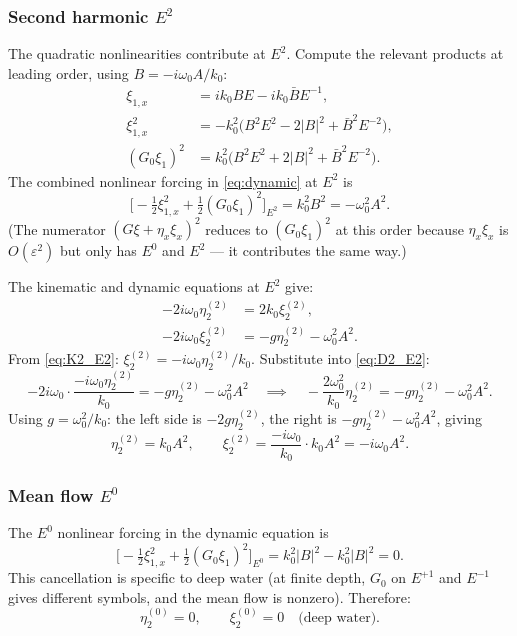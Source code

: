 \documentclass[11pt]{article}
\newcommand{\eps}{\varepsilon}
\begin{document}
\subsubsection{Second harmonic $E^2$}

The quadratic nonlinearities contribute at $E^2$.
Compute the relevant products at leading order, using $B = -i\omega_0 A/k_0$:
\begin{align}
\xi_{1,x} &= ik_0 BE - ik_0\bar B E^{-1}, \\
\xi_{1,x}^2 &= -k_0^2\bigl(B^2 E^2 - 2|B|^2 + \bar B^2 E^{-2}\bigr), \\
(G_0\xi_1)^2 &= k_0^2\bigl(B^2 E^2 + 2|B|^2 + \bar B^2 E^{-2}\bigr).
\end{align}
The combined nonlinear forcing in \eqref{eq:dynamic} at $E^2$ is
\[
\bigl[-\tfrac{1}{2}\xi_{1,x}^2 + \tfrac{1}{2}(G_0\xi_1)^2\bigr]_{E^2}
= k_0^2 B^2 = -\omega_0^2 A^2.
\]
(The numerator $(G\xi + \eta_x\xi_x)^2$ reduces to $(G_0\xi_1)^2$
at this order because $\eta_x\xi_x$ is $O(\eps^2)$ but only has
$E^0$ and $E^2$ --- it contributes the same way.)

The kinematic and dynamic equations at $E^2$ give:
\begin{align}
-2i\omega_0\eta_2^{(2)} &= 2k_0\xi_2^{(2)}, \label{eq:K2_E2}\\
-2i\omega_0\xi_2^{(2)} &= -g\eta_2^{(2)} - \omega_0^2 A^2. \label{eq:D2_E2}
\end{align}
From \eqref{eq:K2_E2}: $\xi_2^{(2)} = -i\omega_0\eta_2^{(2)}/k_0$.
Substitute into \eqref{eq:D2_E2}:
\[
-2i\omega_0\cdot\frac{-i\omega_0\eta_2^{(2)}}{k_0} = -g\eta_2^{(2)} - \omega_0^2 A^2
\quad\implies\quad
-\frac{2\omega_0^2}{k_0}\eta_2^{(2)} = -g\eta_2^{(2)} - \omega_0^2 A^2.
\]
Using $g = \omega_0^2/k_0$:
the left side is $-2g\eta_2^{(2)}$, the right is $-g\eta_2^{(2)} - \omega_0^2 A^2$,
giving
\begin{equation}
\boxed{\eta_2^{(2)} = k_0 A^2}, \qquad
\xi_2^{(2)} = \frac{-i\omega_0}{k_0}\cdot k_0 A^2 = -i\omega_0 A^2.
\label{eq:eta2_E2}
\end{equation}

\subsubsection{Mean flow $E^0$}

The $E^0$ nonlinear forcing in the dynamic equation is
\[
\bigl[-\tfrac{1}{2}\xi_{1,x}^2 + \tfrac{1}{2}(G_0\xi_1)^2\bigr]_{E^0}
= k_0^2|B|^2 - k_0^2|B|^2 = 0.
\]
This cancellation is specific to deep water (at finite depth, $G_0$
on $E^{+1}$ and $E^{-1}$ gives different symbols, and the mean flow
is nonzero).  Therefore:
\begin{equation}
\eta_2^{(0)} = 0, \qquad \xi_2^{(0)} = 0 \quad\text{(deep water)}.
\label{eq:eta2_E0}
\end{equation}
\end{document}
